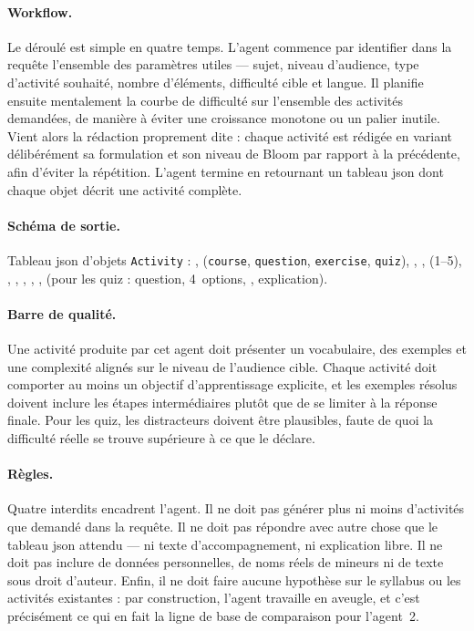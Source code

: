 \paragraph{Workflow.}
Le déroulé est simple en quatre temps. L'agent commence par
identifier dans la requête l'ensemble des paramètres utiles — sujet,
niveau d'audience, type d'activité souhaité, nombre d'éléments,
difficulté cible et langue. Il planifie ensuite mentalement la
courbe de difficulté sur l'ensemble des activités demandées, de
manière à éviter une croissance monotone ou un palier inutile.
Vient alors la rédaction proprement dite : chaque activité est
rédigée en variant délibérément sa formulation et son niveau de
Bloom par rapport à la précédente, afin d'éviter la répétition.
L'agent termine en retournant un tableau \gls{json} dont chaque
objet décrit une activité complète.

\paragraph{Schéma de sortie.} Tableau \gls{json} d'objets \texttt{Activity} :
,  (\texttt{course}, \texttt{question},
\texttt{exercise}, \texttt{quiz}), , ,
 (1--5), , ,
, , ,
 (pour les quiz : question, 4~options, ,
explication).

\paragraph{Barre de qualité.} Une activité produite par cet agent
doit présenter un vocabulaire, des exemples et une complexité alignés
sur le niveau de l'audience cible. Chaque activité doit comporter au
moins un objectif d'apprentissage explicite, et les exemples résolus
doivent inclure les étapes intermédiaires plutôt que de se limiter
à la réponse finale. Pour les quiz, les distracteurs doivent être
plausibles, faute de quoi la difficulté réelle se trouve supérieure
à ce que le  déclare.

\paragraph{Règles.} Quatre interdits encadrent l'agent. Il ne doit
pas générer plus ni moins d'activités que demandé dans la requête.
Il ne doit pas répondre avec autre chose que le tableau \gls{json}
attendu — ni texte d'accompagnement, ni explication libre. Il ne
doit pas inclure de données personnelles, de noms réels de mineurs
ni de texte sous droit d'auteur. Enfin, il ne doit faire aucune
hypothèse sur le syllabus ou les activités existantes : par
construction, l'agent travaille en aveugle, et c'est précisément ce
qui en fait la ligne de base de comparaison pour l'agent~2.


